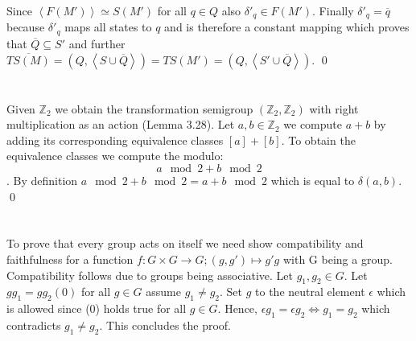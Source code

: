 \documentclass[a4paper,12pt,numbers=noenddot]{scrreport}
\def\lsk{\left<}
\def\rsk{\right>}
\begin{document}
Since $\lsk F(M') \rsk \simeq S(M')$ for all $q \in Q$ also $\delta'_q \in F(M')$.
Finally $\delta'_q = \overline{q}$ because $\delta'_q$ maps all states to $q$ and is therefore a constant mapping which proves that $\overline{Q} \subseteq S'$ and further $\overline{TS(M)}=(Q,\lsk S \cup \overline{Q} \rsk)=TS(M')=(Q,\lsk S' \cup \overline{Q} \rsk)$.
\qed
\section{}
Given $\mathbb{Z}_2$ we obtain the transformation semigroup $(\mathbb{Z}_2,\mathbb{Z}_2)$ with right multiplication as an action (Lemma 3.28).
Let $a,b \in \mathbb{Z}_2$ we compute $a+b$ by adding its corresponding equivalence classes $[a] + [b]$.
To obtain the equivalence classes we compute the modulo:
$$a\mod2 + b \mod2$$.
By definition $a \mod2 + b \mod2 = a + b \mod2$ which is equal to $\delta(a,b)$.
\qed
\section{}
To prove that every group acts on itself we need show compatibility and faithfulness for a function $f: G \times G \rightarrow G; (g,g') \mapsto g'g$ with G being a group.
Compatibility follows  due to groups being associative.
Let $g_1,g_2 \in G$.
Let $gg_1 = gg_2 (0)$ for all $g \in G$ assume $g_1 \neq g_2$. Set $g$ to the neutral element $\epsilon$ which is allowed since (0) holds true for all $g \in G$.
Hence, $\epsilon g_1 = \epsilon g_2 \iff g_1 = g_2$ which contradicts $g_1 \neq g_2$.
This concludes the proof.
\end{document}
